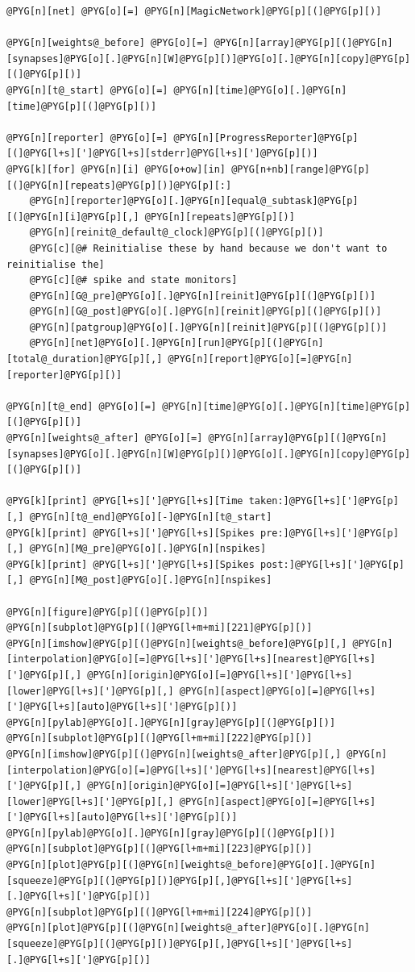 \documentclass[letterpaper,10pt,english]{manual}
\begin{document}
\begin{Verbatim}[commandchars=@\[\]]
@PYG[n][net] @PYG[o][=] @PYG[n][MagicNetwork]@PYG[p][(]@PYG[p][)]

@PYG[n][weights@_before] @PYG[o][=] @PYG[n][array]@PYG[p][(]@PYG[n][synapses]@PYG[o][.]@PYG[n][W]@PYG[p][)]@PYG[o][.]@PYG[n][copy]@PYG[p][(]@PYG[p][)]
@PYG[n][t@_start] @PYG[o][=] @PYG[n][time]@PYG[o][.]@PYG[n][time]@PYG[p][(]@PYG[p][)]

@PYG[n][reporter] @PYG[o][=] @PYG[n][ProgressReporter]@PYG[p][(]@PYG[l+s][']@PYG[l+s][stderr]@PYG[l+s][']@PYG[p][)]
@PYG[k][for] @PYG[n][i] @PYG[o+ow][in] @PYG[n+nb][range]@PYG[p][(]@PYG[n][repeats]@PYG[p][)]@PYG[p][:]
    @PYG[n][reporter]@PYG[o][.]@PYG[n][equal@_subtask]@PYG[p][(]@PYG[n][i]@PYG[p][,] @PYG[n][repeats]@PYG[p][)]
    @PYG[n][reinit@_default@_clock]@PYG[p][(]@PYG[p][)]
    @PYG[c][@# Reinitialise these by hand because we don't want to reinitialise the]
    @PYG[c][@# spike and state monitors]
    @PYG[n][G@_pre]@PYG[o][.]@PYG[n][reinit]@PYG[p][(]@PYG[p][)]
    @PYG[n][G@_post]@PYG[o][.]@PYG[n][reinit]@PYG[p][(]@PYG[p][)]
    @PYG[n][patgroup]@PYG[o][.]@PYG[n][reinit]@PYG[p][(]@PYG[p][)]
    @PYG[n][net]@PYG[o][.]@PYG[n][run]@PYG[p][(]@PYG[n][total@_duration]@PYG[p][,] @PYG[n][report]@PYG[o][=]@PYG[n][reporter]@PYG[p][)]

@PYG[n][t@_end] @PYG[o][=] @PYG[n][time]@PYG[o][.]@PYG[n][time]@PYG[p][(]@PYG[p][)]
@PYG[n][weights@_after] @PYG[o][=] @PYG[n][array]@PYG[p][(]@PYG[n][synapses]@PYG[o][.]@PYG[n][W]@PYG[p][)]@PYG[o][.]@PYG[n][copy]@PYG[p][(]@PYG[p][)]

@PYG[k][print] @PYG[l+s][']@PYG[l+s][Time taken:]@PYG[l+s][']@PYG[p][,] @PYG[n][t@_end]@PYG[o][-]@PYG[n][t@_start]
@PYG[k][print] @PYG[l+s][']@PYG[l+s][Spikes pre:]@PYG[l+s][']@PYG[p][,] @PYG[n][M@_pre]@PYG[o][.]@PYG[n][nspikes]
@PYG[k][print] @PYG[l+s][']@PYG[l+s][Spikes post:]@PYG[l+s][']@PYG[p][,] @PYG[n][M@_post]@PYG[o][.]@PYG[n][nspikes]

@PYG[n][figure]@PYG[p][(]@PYG[p][)]
@PYG[n][subplot]@PYG[p][(]@PYG[l+m+mi][221]@PYG[p][)]
@PYG[n][imshow]@PYG[p][(]@PYG[n][weights@_before]@PYG[p][,] @PYG[n][interpolation]@PYG[o][=]@PYG[l+s][']@PYG[l+s][nearest]@PYG[l+s][']@PYG[p][,] @PYG[n][origin]@PYG[o][=]@PYG[l+s][']@PYG[l+s][lower]@PYG[l+s][']@PYG[p][,] @PYG[n][aspect]@PYG[o][=]@PYG[l+s][']@PYG[l+s][auto]@PYG[l+s][']@PYG[p][)]
@PYG[n][pylab]@PYG[o][.]@PYG[n][gray]@PYG[p][(]@PYG[p][)]
@PYG[n][subplot]@PYG[p][(]@PYG[l+m+mi][222]@PYG[p][)]
@PYG[n][imshow]@PYG[p][(]@PYG[n][weights@_after]@PYG[p][,] @PYG[n][interpolation]@PYG[o][=]@PYG[l+s][']@PYG[l+s][nearest]@PYG[l+s][']@PYG[p][,] @PYG[n][origin]@PYG[o][=]@PYG[l+s][']@PYG[l+s][lower]@PYG[l+s][']@PYG[p][,] @PYG[n][aspect]@PYG[o][=]@PYG[l+s][']@PYG[l+s][auto]@PYG[l+s][']@PYG[p][)]
@PYG[n][pylab]@PYG[o][.]@PYG[n][gray]@PYG[p][(]@PYG[p][)]
@PYG[n][subplot]@PYG[p][(]@PYG[l+m+mi][223]@PYG[p][)]
@PYG[n][plot]@PYG[p][(]@PYG[n][weights@_before]@PYG[o][.]@PYG[n][squeeze]@PYG[p][(]@PYG[p][)]@PYG[p][,]@PYG[l+s][']@PYG[l+s][.]@PYG[l+s][']@PYG[p][)]
@PYG[n][subplot]@PYG[p][(]@PYG[l+m+mi][224]@PYG[p][)]
@PYG[n][plot]@PYG[p][(]@PYG[n][weights@_after]@PYG[o][.]@PYG[n][squeeze]@PYG[p][(]@PYG[p][)]@PYG[p][,]@PYG[l+s][']@PYG[l+s][.]@PYG[l+s][']@PYG[p][)]


\end{Verbatim}
\end{document}
